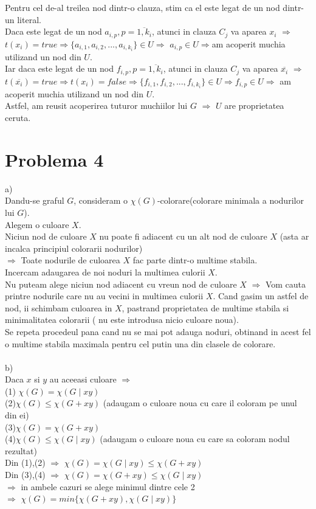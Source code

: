 \documentclass{article}
\begin{document}
Pentru cel de-al treilea nod dintr-o clauza, stim ca el este legat de un nod dintr-un literal.\\
Daca este legat de un nod $a_{i,p},p=\overline{1,k_i}$, atunci in clauza $C_j$ va aparea $x_i$ $\Rightarrow$
$t(x_i)=true$$\Rightarrow$$\{a_{i,1},a_{i,2},...,a_{i,k_i}\}\in U$$\Rightarrow$ $a_{i,p}\in U\Rightarrow$am acoperit muchia utilizand un nod din $U$.\\
Iar daca este legat de un nod $f_{i,p},p=\overline{1,k_i}$, atunci in clauza $C_j$ va aparea $\overline{x_i}$
$\Rightarrow$ $t(\overline{x_i})=true$$\Rightarrow$$t(x_i)=false$$\Rightarrow$$\{f_{i,1},f_{i,2},...,f_{i,k_i}\}\in U$$\Rightarrow$$f_{i,p}\in U$$\Rightarrow$ am acoperit muchia utilizand un nod din $U$.\\
Astfel, am reusit acoperirea tuturor muchiilor lui $G$ $\Rightarrow$ $U$ are proprietatea ceruta.\\

\newpage
\section*{Problema 4}
\Large
a)\\
Dandu-se graful $G$, consideram o $\chi(G)$-colorare(colorare minimala a nodurilor lui $G$).\\
Alegem o culoare $X$.\\
Niciun nod de culoare $X$ nu poate fi adiacent cu un alt nod de culoare $X$ (asta ar incalca principiul colorarii nodurilor)\\
$\Rightarrow$ Toate nodurile de culoarea $X$ fac parte dintr-o multime stabila.\\
Incercam adaugarea de noi noduri la multimea culorii $X$.\\
Nu puteam alege niciun nod adiacent cu vreun nod de culoare $X$ $\Rightarrow$ Vom cauta printre nodurile care nu au vecini in multimea culorii $X$. Cand gasim un astfel de nod, ii schimbam culoarea in $X$, pastrand proprietatea de multime stabila si minimalitatea colorarii ( nu este introdusa nicio culoare noua).\\
Se repeta procedeul pana cand nu se mai pot adauga noduri, obtinand in acest fel o multime stabila maximala pentru cel putin una din clasele de colorare.\\
\bigskip\\
b)\\
Daca $x$ si $y$ au aceeasi culoare $\Rightarrow$\\
(1) $\chi(G)=\chi(G\mid xy)$\\
(2)$\chi(G) \leq \chi(G+xy)$ (adaugam o culoare noua cu care il coloram pe unul din ei)\\
(3)$\chi(G)=\chi(G+xy)$\\
(4)$\chi(G) \leq \chi(G\mid xy)$ (adaugam o culoare noua cu care sa coloram nodul rezultat)\\
Din (1),(2) $\Rightarrow$ $\chi(G)=\chi(G\mid xy)\leq \chi(G+xy)$\\
Din (3),(4) $\Rightarrow$ $\chi(G)=\chi(G+xy)\leq \chi(G\mid xy)$\\
$\Rightarrow$ in ambele cazuri se alege minimul dintre cele 2\\
$\Rightarrow$ $\chi(G)=min\{\chi(G+xy),\chi(G\mid xy)\}$\\
\end{document}

